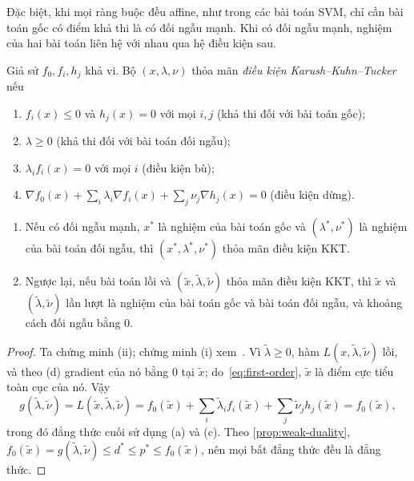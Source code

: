 Đặc biệt, khi mọi ràng buộc đều affine, như trong các bài toán SVM, chỉ cần bài toán gốc có điểm khả thi là có đối ngẫu mạnh. Khi có đối ngẫu mạnh, nghiệm của hai bài toán liên hệ với nhau qua hệ điều kiện sau.

\begin{definition}\label{def:kkt}
Giả sử $f_0,f_i,h_j$ khả vi. Bộ $(x,\lambda,\nu)$ thỏa mãn \emph{điều kiện Karush--Kuhn--Tucker} nếu
\begin{enumerate}[label=(\alph*),leftmargin=2em]
\item $f_i(x)\le0$ và $h_j(x)=0$ với mọi $i,j$ (khả thi đối với bài toán gốc);
\item $\lambda\ge0$ (khả thi đối với bài toán đối ngẫu);
\item $\lambda_if_i(x)=0$ với mọi $i$ (điều kiện bù);
\item $\nabla f_0(x)+\sum_i\lambda_i\nabla f_i(x)+\sum_j\nu_j\nabla h_j(x)=0$ (điều kiện dừng).
\end{enumerate}
\end{definition}

\begin{theorem}\label{thm:kkt}
\begin{enumerate}[label=(\roman*),leftmargin=2em]
\item Nếu có đối ngẫu mạnh, $x^\ast$ là nghiệm của bài toán gốc và $(\lambda^\ast,\nu^\ast)$ là nghiệm của bài toán đối ngẫu, thì $(x^\ast,\lambda^\ast,\nu^\ast)$ thỏa mãn điều kiện KKT.
\item Ngược lại, nếu bài toán lồi và $(\tilde x,\tilde\lambda,\tilde\nu)$ thỏa mãn điều kiện KKT, thì $\tilde x$ và $(\tilde\lambda,\tilde\nu)$ lần lượt là nghiệm của bài toán gốc và bài toán đối ngẫu, và khoảng cách đối ngẫu bằng $0$.
\end{enumerate}
\end{theorem}

\begin{proof}
Ta chứng minh (ii); chứng minh (i) xem~\cite[Mục~5.5.3]{boyd2004}. Vì $\tilde\lambda\ge0$, hàm $L(x,\tilde\lambda,\tilde\nu)$ lồi, và theo (d) gradient của nó bằng $0$ tại $\tilde x$; do~\eqref{eq:first-order}, $\tilde x$ là điểm cực tiểu toàn cục của nó. Vậy
\[
g(\tilde\lambda,\tilde\nu)=L(\tilde x,\tilde\lambda,\tilde\nu)=f_0(\tilde x)+\sum_i\tilde\lambda_if_i(\tilde x)+\sum_j\tilde\nu_jh_j(\tilde x)=f_0(\tilde x),
\]
trong đó đẳng thức cuối sử dụng (a) và (c). Theo \cref{prop:weak-duality}, $f_0(\tilde x)=g(\tilde\lambda,\tilde\nu)\le d^\ast\le p^\ast\le f_0(\tilde x)$, nên mọi bất đẳng thức đều là đẳng thức.
\end{proof}

